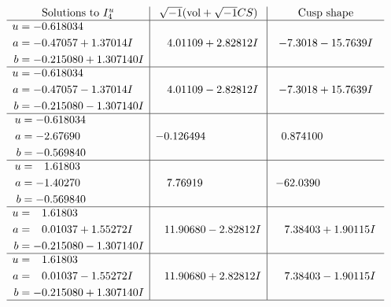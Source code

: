\documentclass[1p]{elsarticle_modified}
\theoremstyle{definition}
\newcommand{\I}{\sqrt{-1}}
\begin{document}
$$\begin{array}{c|c|c}  
\text{Solutions to }I^u_{4}& \I (\text{vol} + \sqrt{-1}CS) & \text{Cusp shape}\\
 \hline 
\begin{aligned}
u &= -0.618034\phantom{ +0.000000I} \\
a &= -0.47057 + 1.37014 I \\
b &= -0.215080 + 1.307140 I\end{aligned}
 & \phantom{-}4.01109 + 2.82812 I & -7.3018 - 15.7639 I \\ \hline\begin{aligned}
u &= -0.618034\phantom{ +0.000000I} \\
a &= -0.47057 - 1.37014 I \\
b &= -0.215080 - 1.307140 I\end{aligned}
 & \phantom{-}4.01109 - 2.82812 I & -7.3018 + 15.7639 I \\ \hline\begin{aligned}
u &= -0.618034\phantom{ +0.000000I} \\
a &= -2.67690\phantom{ +0.000000I} \\
b &= -0.569840\phantom{ +0.000000I}\end{aligned}
 & -0.126494\phantom{ +0.000000I} & \phantom{-}0.874100\phantom{ +0.000000I} \\ \hline\begin{aligned}
u &= \phantom{-}1.61803\phantom{ +0.000000I} \\
a &= -1.40270\phantom{ +0.000000I} \\
b &= -0.569840\phantom{ +0.000000I}\end{aligned}
 & \phantom{-}7.76919\phantom{ +0.000000I} & -62.0390\phantom{ +0.000000I} \\ \hline\begin{aligned}
u &= \phantom{-}1.61803\phantom{ +0.000000I} \\
a &= \phantom{-}0.01037 + 1.55272 I \\
b &= -0.215080 - 1.307140 I\end{aligned}
 & \phantom{-}11.90680 - 2.82812 I & \phantom{-}7.38403 + 1.90115 I \\ \hline\begin{aligned}
u &= \phantom{-}1.61803\phantom{ +0.000000I} \\
a &= \phantom{-}0.01037 - 1.55272 I \\
b &= -0.215080 + 1.307140 I\end{aligned}
 & \phantom{-}11.90680 + 2.82812 I & \phantom{-}7.38403 - 1.90115 I\\
 \hline 
 \end{array}$$\newpage
\end{document}
